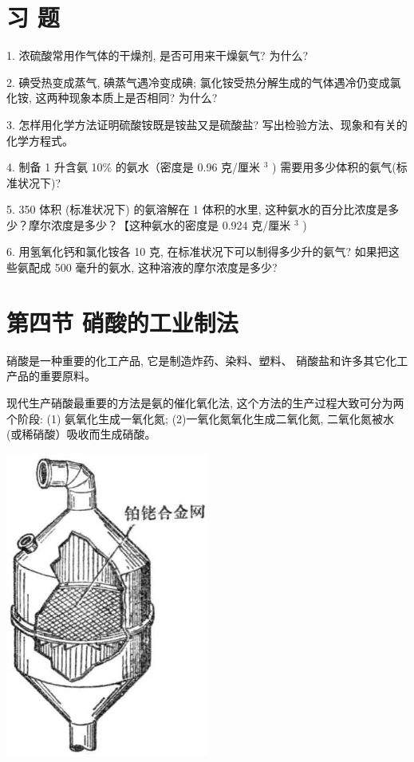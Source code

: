 \documentclass[10pt]{article}
\begin{document}
\section*{习 题}

1. 浓硫酸常用作气体的干燥剂, 是否可用来干燥氨气? 为什么?

2. 碘受热变成蒸气, 碘蒸气遇冷变成碘; 氯化铵受热分解生成的气体遇冷仍变成氯化铵, 这两种现象本质上是否相同? 为什么?

3. 怎样用化学方法证明硫酸铵既是铵盐又是硫酸盐? 写出检验方法、现象和有关的化学方程式。

4. 制备 1 升含氨 10\% 的氨水（密度是 0.96 克/厘米 \({}^{3}\) ) 需要用多少体积的氨气(标准状况下)?

5. 350 体积 (标准状况下) 的氨溶解在 1 体积的水里, 这种氨水的百分比浓度是多少？摩尔浓度是多少？【这种氨水的密度是 0.924 克/厘米 \({}^{3}\) )

6. 用氢氧化钙和氯化铵各 10 克, 在标准状况下可以制得多少升的氨气? 如果把这些氨配成 500 毫升的氨水, 这种溶液的摩尔浓度是多少?

\section*{第四节 硝酸的工业制法}

硝酸是一种重要的化工产品, 它是制造炸药、染料、塑料、 硝酸盐和许多其它化工产品的重要原料。

现代生产硝酸最重要的方法是氨的催化氧化法, 这个方法的生产过程大致可分为两个阶段: (1) 氨氧化生成一氧化氮; (2)一氧化氮氧化生成二氧化氮, 二氧化氮被水(或稀硝酸）吸收而生成硝酸。

\begin{center}
\includegraphics[max width=0.5\textwidth]{images/01912d13-9986-7822-a012-3f3f7be99dcb_48_912596.jpg}
\end{center}
\end{document}
